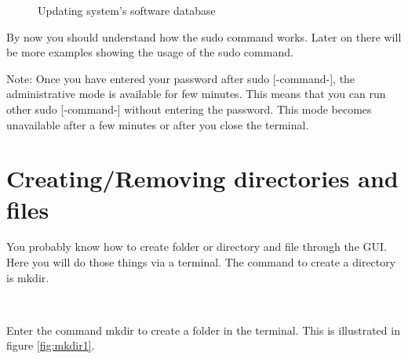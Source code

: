 \begin{figure}[h!]	
	\centering
	\caption{Updating system's software database}	
	\label{fig:sudo3}	
\end{figure}

\par \noindent By now you should understand how the sudo command works. Later on there will be more examples showing the usage of the sudo command. \\

\par \noindent Note: Once you have entered  your password after sudo [-command-], the administrative mode is available for few minutes. This means that you can run other sudo [-command-] without entering the password. This mode becomes unavailable after a few minutes or after you close the terminal. \\

\section{Creating/Removing directories and files}  
You probably know how to create folder or directory and file through the GUI. Here you will do those things via a terminal. The command to create a directory is mkdir. \\

\par \noindent {} \\

\par \noindent  Enter the command mkdir to create a folder in the terminal. This is illustrated in figure \ref{fig:mkdir1}.

